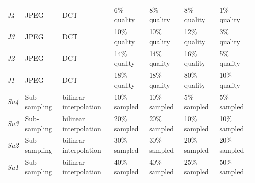 \begin{table}[]
\begin{tabular}{lllllll}
\textit{J4} & JPEG            & DCT                    & 6\% quality    & 8\% quality  & 8\% quality          & 1\% quality    \\
\textit{J3} & JPEG            & DCT                    & 10\% quality   & 10\% quality & 12\% quality         & 3\% quality    \\
\textit{J2} & JPEG            & DCT                    & 14\% quality   & 14\% quality & 16\% quality         & 5\% quality    \\
\textit{J1} & JPEG            & DCT                    & 18\% quality   & 18\% quality & 80\% quality         & 10\% quality   \\
\textit{Su4} & Sub-sampling    & bilinear interpolation & 10\% sampled   & 10\% sampled & 5\% sampled          & 5\% sampled    \\
\textit{Su3} & Sub-sampling    & bilinear interpolation & 20\% sampled   & 20\% sampled & 10\% sampled         & 10\% sampled   \\
\textit{Su2} & Sub-sampling    & bilinear interpolation & 30\% sampled   & 30\% sampled & 20\% sampled         & 20\% sampled   \\
\textit{Su1} & Sub-sampling    & bilinear interpolation & 40\% sampled   & 40\% sampled & 25\% sampled         & 50\% sampled  
\end{tabular}
\end{table}

